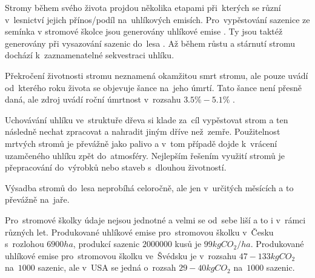 \documentclass[a4paper, 11pt, titlepage]{article}
\begin{document}

Stromy během svého života projdou několika etapami při~kterých se různí v~lesnictví jejich přínos/podíl na~uhlíkových emisích. Pro~vypěstování sazenice ze semínka v stromové školce jsou generovány uhlíkové emise \cite{School_Forest_Enterprise}. Ty jsou taktéž generovány při vysazování sazenic do~lesa \cite{School_Forest_Enterprise}. Až během růstu a stárnutí stromu dochází k~zaznamenatelné sekvestraci uhlíku. 

Překročení životnosti stromu neznamená okamžitou smrt stromu, ale pouze uvádí od~kterého roku života se objevuje šance na~jeho úmrtí. Tato šance není přesně daná, ale zdroj uvádí roční úmrtnost v~rozsahu $3.5\%-5.1\%$ \cite{Tree_Lifespan}. 

Uchovávání uhlíku ve~struktuře dřeva si klade za~cíl vypěstovat strom a ten následně nechat zpracovat a nahradit jiným dříve než~zemře. Použitelnost mrtvých stromů je převážně jako palivo a v~tom případě dojde k~vrácení uzamčeného uhlíku zpět do~atmosféry. Nejlepším řešením využití stromů je přepracování do~výrobků nebo staveb s~dlouhou životností.\cite{Carbon_in_Wood}

Výsadba stromů do~lesa neprobíhá celoročně, ale jen v~určitých měsících a to převážně na~jaře.\cite{School_Forest_Enterprise}

Pro~stromové školky údaje nejsou jednotné a velmi se od~sebe liší a to i v~rámci různých let. Produkované uhlíkové emise pro~stromovou školku v~Česku s~rozlohou $6900ha$, produkcí sazenic $2000000$ kusů je $99kgCO_2/ha$\cite{School_Forest_Enterprise}. 
Produkované uhlíkové emise pro~stromovou školku ve~Švédsku je v~rozsahu $47-133kgCO_2$ na~$1000$ sazenic, ale v~USA se jedná o~rozsah $29-40kgCO_2$ na~$1000$ sazenic\cite{greenhouse}.
\end{document}
